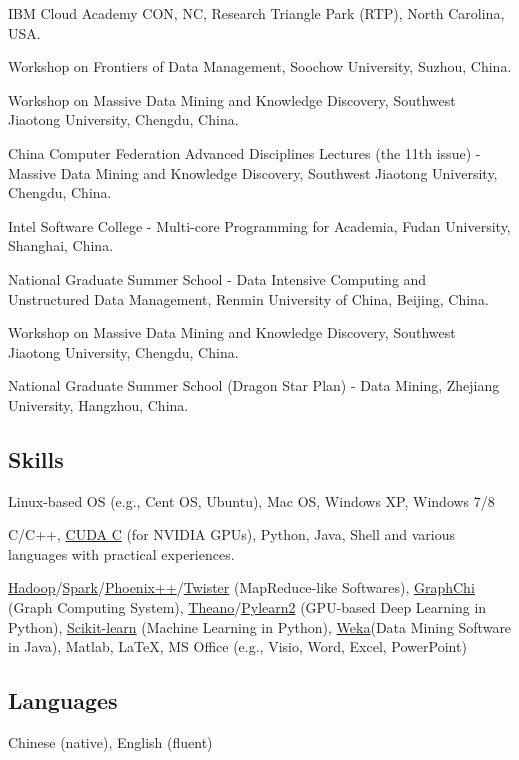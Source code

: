 \documentclass[10pt,a4paper]{article}
\renewenvironment{description}{
  \begin{basedescript}{\desclabelstyle{\pushlabel}\desclabelwidth{8em}}
}{
  \end{basedescript}
}
\begin{document}
\begin{description}
\item[04/2012]
IBM Cloud Academy CON, NC, Research Triangle Park (RTP), North Carolina,
USA.
\item[12/2010]
Workshop on Frontiers of Data Management, Soochow University, Suzhou,
China.
\item[11/2010]
Workshop on Massive Data Mining and Knowledge Discovery, Southwest
Jiaotong University, Chengdu, China.
\item[11/2010]
China Computer Federation Advanced Disciplines Lectures (the 11th issue)
- Massive Data Mining and Knowledge Discovery, Southwest Jiaotong
University, Chengdu, China.
\item[08/2010]
Intel Software College - Multi-core Programming for Academia, Fudan
University, Shanghai, China.
\item[07/2010]
National Graduate Summer School - Data Intensive Computing and
Unstructured Data Management, Renmin University of China, Beijing,
China.
\item[12/2009]
Workshop on Massive Data Mining and Knowledge Discovery, Southwest
Jiaotong University, Chengdu, China.
\item[08/2009]
National Graduate Summer School (Dragon Star Plan) - Data Mining,
Zhejiang University, Hangzhou, China.
\end{description}

\subsection{Skills}\label{skills}

\begin{description}
\item[Operating System]
Linux-based OS (e.g., Cent OS, Ubuntu), Mac OS, Windows XP, Windows 7/8
\item[Programming]
C/C++, \href{http://www.nvidia.com/object/cuda_home_new.html}{CUDA C}
(for NVIDIA GPUs), Python, Java, Shell and various languages with
practical experiences.
\item[Others]
\href{http://hadoop.apache.org/}{Hadoop}/\href{http://spark.apache.org/}{Spark}/\href{http://mapreduce.stanford.edu/}{Phoenix++}/\href{http://www.iterativemapreduce.org/}{Twister}
(MapReduce-like Softwares), \href{https://github.com/GraphChi}{GraphChi}
(Graph Computing System),
\href{http://deeplearning.net/software/theano/}{Theano}/\href{http://deeplearning.net/software/pylearn2/}{Pylearn2}
(GPU-based Deep Learning in Python),
\href{http://scikit-learn.org/stable/}{Scikit-learn} (Machine Learning
in Python), \href{http://www.cs.waikato.ac.nz/ml/weka/}{Weka}(Data
Mining Software in Java), Matlab, \LaTeX, MS Office (e.g., Visio, Word,
Excel, PowerPoint)
\end{description}

\subsection{Languages}\label{languages}

Chinese (native), English (fluent)
\end{document}
